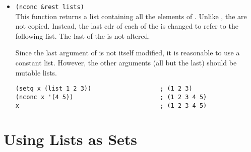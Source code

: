 \begin{itemize}
\item \lstinline|(nconc &rest lists)|\\
  This function returns a list containing all the elements of .
  Unlike , the  are not copied.
  Instead, the last cdr of each of the  is changed to refer to the following list.
  The last of the  is not altered.

  Since the last argument of  is not itself modified, it is reasonable to use a constant list.
  However, the other arguments (all but the last) should be mutable lists.

\begin{lstlisting}
(setq x (list 1 2 3))                   ; (1 2 3)
(nconc x '(4 5))                        ; (1 2 3 4 5)
x                                       ; (1 2 3 4 5)
\end{lstlisting}
\end{itemize}

\section{Using Lists as Sets}
\label{sec:using-lists-as}

